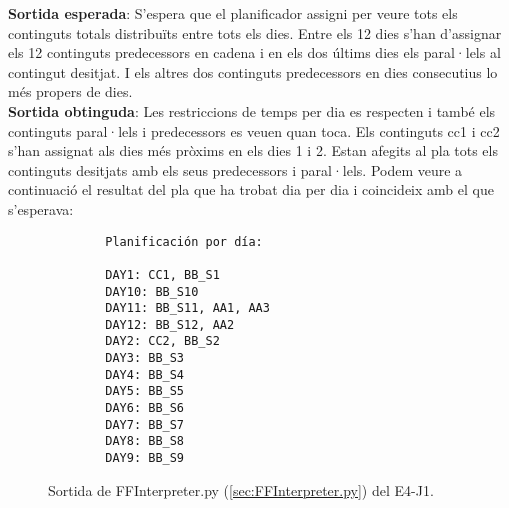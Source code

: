 \documentclass[a4paper]{article}
\begin{document}
	\noindent \textbf{Sortida esperada}: S'espera que el planificador assigni per veure tots els continguts totals distribuïts entre tots els dies. Entre els 12 dies s'han d'assignar els 12 continguts predecessors en cadena i en els dos últims dies els paral·lels al contingut desitjat. I els altres dos continguts predecessors en dies consecutius lo més propers de dies. \\
	
	\noindent \textbf{Sortida obtinguda}:  Les restriccions de temps per dia es respecten i també els continguts paral·lels i predecessors es veuen quan toca. Els continguts cc1 i cc2 s'han assignat als dies més pròxims en els dies 1 i 2. Estan afegits al pla tots els continguts desitjats amb els seus predecessors i paral·lels. Podem veure a continuació el resultat del pla que ha trobat dia per dia i coincideix amb el que s'esperava:
	
	\begin{figure}[H]
		\centering
		\begin{verbatim}
		Planificación por día:
		
		DAY1: CC1, BB_S1
		DAY10: BB_S10
		DAY11: BB_S11, AA1, AA3
		DAY12: BB_S12, AA2
		DAY2: CC2, BB_S2
		DAY3: BB_S3
		DAY4: BB_S4
		DAY5: BB_S5
		DAY6: BB_S6
		DAY7: BB_S7
		DAY8: BB_S8
		DAY9: BB_S9
		\end{verbatim}
		\caption{Sortida de FFInterpreter.py (\ref{sec:FFInterpreter.py}) del E4-J1.}
	\end{figure}
	
	
	
\end{document}
